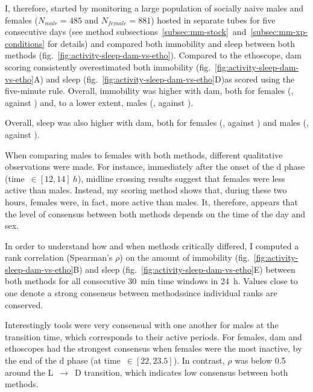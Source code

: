 I, therefore, started by monitoring a large population of socially naive males and females ($N_{male} = 485$ and $N_{female} = 881$) hosted in separate tubes for five consecutive days (see method subsections~\ref{subsec:mm-stock}~and~\ref{subsec:mm-xp-conditions} for details) and compared both immobility and sleep between both methods (fig.~\ref{fig:activity-sleep-dam-vs-etho}).
Compared to the ethoscope, \gls{dam} scoring consistently overestimated both immobility 
(fig.~\ref{fig:activity-sleep-dam-vs-etho}A) and  sleep (fig.~\ref{fig:activity-sleep-dam-vs-etho}D)\emd{}as scored using the five-minute rule. 
Overall, immobility was higher with \gls{dam}, both for
females 	(, against
			 )
and, to a lower extent, 
males       (, against
			 ).
			 
Overall, sleep was also higher with \gls{dam}, both for
females 	(, against
			 )
and males   (, against
			 ).
 
When comparing males to females with both methods, different qualitative observations were made.
For instance, immediately after the onset of the \gls{d} phase (time~$\in [12,14]~h$), midline crossing results suggest that females were less active than males. 
Instead, my scoring method shows that, during these two hours, females were, in fact, more active than males.
It, therefore, appears that the level of consensus between both methods depends on the time of the day and sex.

In order to understand how and when methods critically differed, I computed a rank correlation (Spearman's $\rho$) on the amount of immobility (fig.~\ref{fig:activity-sleep-dam-vs-etho}B)  and sleep  (fig.~\ref{fig:activity-sleep-dam-vs-etho}E) between both methods for all consecutive  30~min time windows in 24~h. 
Values close to one denote a strong consensus between methods\emd{}since individual ranks are conserved.

Interestingly tools were very consensual with one another for males at the transition time, which corresponds to their active periods.
For females, \gls{dam} and ethoscopes had the strongest consensus when females were the most inactive, by the end of the \gls{d} phase (at time~$\in [22,23.5]$).
In contrast, $\rho$ was below 0.5 around the L~$\rightarrow$~D transition, which indicates low consensus between both methods.

